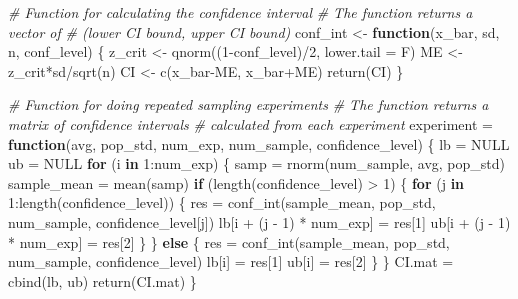 \documentclass[
]{article}
\newenvironment{Shaded}{\begin{snugshade}}{\end{snugshade}}
\newcommand{\AttributeTok}[1]{\textcolor[rgb]{0.77,0.63,0.00}{#1}}
\newcommand{\CommentTok}[1]{\textcolor[rgb]{0.56,0.35,0.01}{\textit{#1}}}
\newcommand{\ConstantTok}[1]{\textcolor[rgb]{0.00,0.00,0.00}{#1}}
\newcommand{\ControlFlowTok}[1]{\textcolor[rgb]{0.13,0.29,0.53}{\textbf{#1}}}
\newcommand{\DecValTok}[1]{\textcolor[rgb]{0.00,0.00,0.81}{#1}}
\newcommand{\FunctionTok}[1]{\textcolor[rgb]{0.00,0.00,0.00}{#1}}
\newcommand{\NormalTok}[1]{#1}
\newcommand{\OtherTok}[1]{\textcolor[rgb]{0.56,0.35,0.01}{#1}}
\newcommand{\SpecialCharTok}[1]{\textcolor[rgb]{0.00,0.00,0.00}{#1}}
\begin{document}
\begin{Shaded}
\begin{Highlighting}[]
\CommentTok{\# Function for calculating the confidence interval}
\CommentTok{\# The function returns a vector of }
\CommentTok{\# (lower CI bound, upper CI bound)}
\NormalTok{conf\_int }\OtherTok{\textless{}{-}} \ControlFlowTok{function}\NormalTok{(x\_bar, sd, n, conf\_level) \{}
\NormalTok{  z\_crit }\OtherTok{\textless{}{-}} \FunctionTok{qnorm}\NormalTok{((}\DecValTok{1}\SpecialCharTok{{-}}\NormalTok{conf\_level)}\SpecialCharTok{/}\DecValTok{2}\NormalTok{, }\AttributeTok{lower.tail =}\NormalTok{ F)}
\NormalTok{  ME }\OtherTok{\textless{}{-}}\NormalTok{ z\_crit}\SpecialCharTok{*}\NormalTok{sd}\SpecialCharTok{/}\FunctionTok{sqrt}\NormalTok{(n)}
\NormalTok{  CI }\OtherTok{\textless{}{-}} \FunctionTok{c}\NormalTok{(x\_bar}\SpecialCharTok{{-}}\NormalTok{ME, x\_bar}\SpecialCharTok{+}\NormalTok{ME)}
  \FunctionTok{return}\NormalTok{(CI)}
\NormalTok{\}}

\CommentTok{\# Function for doing repeated sampling experiments}
\CommentTok{\# The function returns a matrix of confidence intervals}
\CommentTok{\# calculated from each experiment}
\NormalTok{experiment }\OtherTok{=} \ControlFlowTok{function}\NormalTok{(avg, pop\_std, num\_exp, num\_sample, confidence\_level) \{}
\NormalTok{  lb }\OtherTok{=} \ConstantTok{NULL}
\NormalTok{  ub }\OtherTok{=} \ConstantTok{NULL}
  \ControlFlowTok{for}\NormalTok{ (i }\ControlFlowTok{in} \DecValTok{1}\SpecialCharTok{:}\NormalTok{num\_exp) \{}
\NormalTok{    samp }\OtherTok{=} \FunctionTok{rnorm}\NormalTok{(num\_sample, avg, pop\_std) }
\NormalTok{    sample\_mean }\OtherTok{=} \FunctionTok{mean}\NormalTok{(samp)}
    \ControlFlowTok{if}\NormalTok{ (}\FunctionTok{length}\NormalTok{(confidence\_level) }\SpecialCharTok{\textgreater{}} \DecValTok{1}\NormalTok{) \{}
      \ControlFlowTok{for}\NormalTok{ (j }\ControlFlowTok{in} \DecValTok{1}\SpecialCharTok{:}\FunctionTok{length}\NormalTok{(confidence\_level)) \{}
\NormalTok{        res }\OtherTok{=} \FunctionTok{conf\_int}\NormalTok{(sample\_mean, pop\_std, num\_sample, confidence\_level[j])}
\NormalTok{        lb[i }\SpecialCharTok{+}\NormalTok{ (j }\SpecialCharTok{{-}} \DecValTok{1}\NormalTok{) }\SpecialCharTok{*}\NormalTok{ num\_exp] }\OtherTok{=}\NormalTok{ res[}\DecValTok{1}\NormalTok{]}
\NormalTok{        ub[i }\SpecialCharTok{+}\NormalTok{ (j }\SpecialCharTok{{-}} \DecValTok{1}\NormalTok{) }\SpecialCharTok{*}\NormalTok{ num\_exp] }\OtherTok{=}\NormalTok{ res[}\DecValTok{2}\NormalTok{]}
\NormalTok{      \}}
\NormalTok{    \} }\ControlFlowTok{else}\NormalTok{ \{}
\NormalTok{      res }\OtherTok{=} \FunctionTok{conf\_int}\NormalTok{(sample\_mean, pop\_std, num\_sample, confidence\_level)}
\NormalTok{      lb[i] }\OtherTok{=}\NormalTok{ res[}\DecValTok{1}\NormalTok{]}
\NormalTok{      ub[i] }\OtherTok{=}\NormalTok{ res[}\DecValTok{2}\NormalTok{]}
\NormalTok{    \}}
\NormalTok{  \}}
\NormalTok{  CI.mat }\OtherTok{=} \FunctionTok{cbind}\NormalTok{(lb, ub)}
  \FunctionTok{return}\NormalTok{(CI.mat)}
\NormalTok{\}}


\end{Highlighting}
\end{Shaded}
\end{document}
